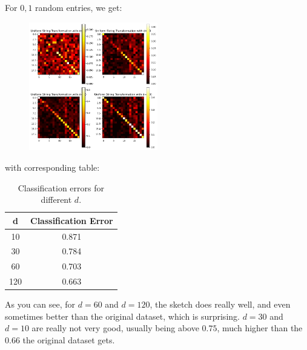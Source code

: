 \documentclass[12pt]{article}
\theoremstyle{definitionstyle}
\begin{document}
\begin{enumerate}[leftmargin=\labelsep]
\begin{enumerate}
            For $0,1$ random entries, we get:
            \begin{figure}[H]
                \centering
                \includegraphics[width=0.5\textwidth]{string_heatmaps.png}
            \end{figure}
            with corresponding table:
            \begin{table}[H]
                \centering
                \begin{tabular}{|c|c|}
                    \hline
                    \textbf{d} & \textbf{Classification Error} \\ \hline
                    10         & 0.871                         \\ \hline
                    30         & 0.784                         \\ \hline
                    60         & 0.703                         \\ \hline
                    120        & 0.663                         \\ \hline
                \end{tabular}
                \caption{Classification errors for different \( d \).}
                \label{tab:classification_errors}
            \end{table}
            As you can see, for $d = 60$ and $d = 120$, the sketch does really well, and even sometimes better than the original dataset, which is surprising. $d = 30$ and $d = 10$ are really not very good, usually being above $0.75$, much higher than the $0.66$ the original dataset gets. 


\end{enumerate}
\end{enumerate}
\end{document}

